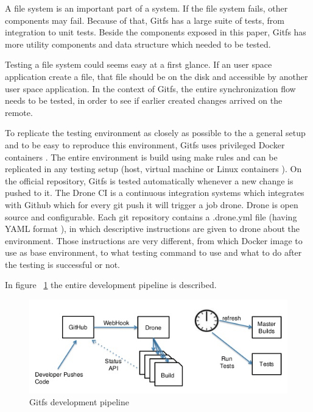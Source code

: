 A file system is an important part of a system. If the file system fails, other components may fail. Because of that, Gitfs has a large suite of tests, from integration to unit tests. Beside the components exposed in this paper, Gitfs has more utility components and data structure which needed to be tested.

Testing a file system could seems easy at a first glance. If an user space application create a file, that file should be on the disk and accessible by another user space application. In the context of Gitfs, the entire synchronization flow needs to be tested, in order to see if earlier created changes arrived on the remote.

To replicate the testing environment as closely as possible to the a general setup and to be easy to reproduce this environment, Gitfs uses privileged Docker containers \cite{Merkel2014}. The entire environment is build using make rules and can be replicated in any testing setup (host, virtual machine or Linux containers \cite{Rosen2014}). On the official repository, Gitfs is tested automatically whenever a new change is pushed to it. The Drone CI \cite{Drone2016} is a continuous integration systems which integrates with Github which for every git push it will trigger a job drone. Drone is open source and configurable. Each git repository contains a .drone.yml file (having YAML format \cite{Ben-Kiki2009}), in which descriptive instructions are given to drone about the environment. Those instructions are very different, from which Docker image to use as base environment, to what testing command to use and what to do after the testing is successful or not.

In figure ~\ref{fig:pipeline} the entire development pipeline is described.

\begin{figure}[h]
  \begin{center}
    \includegraphics[width=16cm]{layout/drone.png}
  \end{center}
  \caption{Gitfs development pipeline}
  \label{fig:pipeline}
\end{figure}

